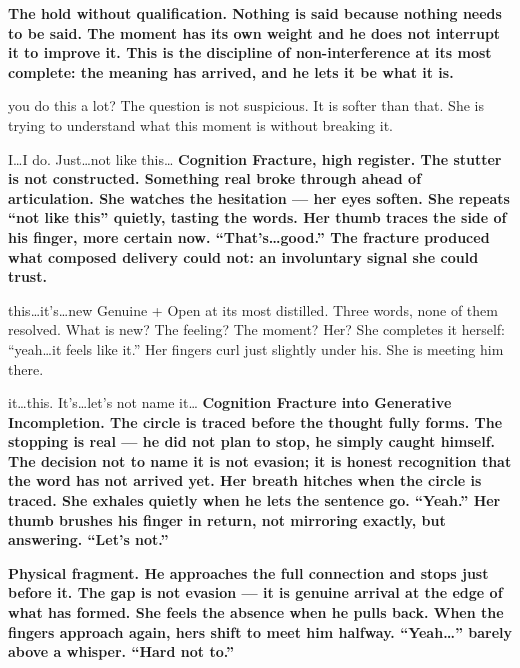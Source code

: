 {\textbf{The hold without qualification. Nothing is said because nothing needs to be said. The moment has its own weight and he does not interrupt it to improve it. This is the discipline of non-interference at its most complete: the meaning has arrived, and he lets it be what it is.}}

\thinrule

{you do this a lot?}
{The question is not suspicious. It is softer than that. She is trying to understand what this moment is without breaking it.}

{I\ldots I do. Just\ldots not like this\ldots}
{\textbf{Cognition Fracture, high register. The stutter is not constructed. Something real broke through ahead of articulation. She watches the hesitation --- her eyes soften. She repeats ``not like this'' quietly, tasting the words. Her thumb traces the side of his finger, more certain now. ``That's\ldots good.'' The fracture produced what composed delivery could not: an involuntary signal she could trust.}}

\thinrule

{this\ldots it's\ldots new}
{Genuine + Open at its most distilled. Three words, none of them resolved. What is new? The feeling? The moment? Her? She completes it herself: ``yeah\ldots it feels like it.'' Her fingers curl just slightly under his. She is meeting him there.}

\thinrule

{it\ldots this. It's\ldots let's not name it\ldots}
{\textbf{Cognition Fracture into Generative Incompletion. The circle is traced before the thought fully forms. The stopping is real --- he did not plan to stop, he simply caught himself. The decision not to name it is not evasion; it is honest recognition that the word has not arrived yet. Her breath hitches when the circle is traced. She exhales quietly when he lets the sentence go. ``Yeah.'' Her thumb brushes his finger in return, not mirroring exactly, but answering. ``Let's not.''}}

\thinrule

{\textbf{Physical fragment. He approaches the full connection and stops just before it. The gap is not evasion --- it is genuine arrival at the edge of what has formed. She feels the absence when he pulls back. When the fingers approach again, hers shift to meet him halfway. ``Yeah\ldots'' barely above a whisper. ``Hard not to.''}}

